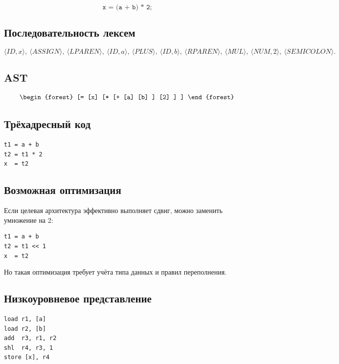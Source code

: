 \documentclass[12pt,a4paper]{article}
\begin{document}
\[
\texttt{x = (a + b) * 2;}
\]

\subsection{Последовательность лексем}

\[
\langle ID,x\rangle,\
\langle ASSIGN\rangle,\
\langle LPAREN\rangle,\
\langle ID,a\rangle,\
\langle PLUS\rangle,\
\langle ID,b\rangle,\
\langle RPAREN\rangle,\
\langle MUL\rangle,\
\langle NUM,2\rangle,\
\langle SEMICOLON\rangle.
\]

\subsection{AST}

\[
\begin{forest}
[=
    [x]
    [*
        [+
            [a]
            [b]
        ]
        [2]
    ]
]
\end{forest}
\]

\subsection{Трёхадресный код}

\begin{lstlisting}
t1 = a + b
t2 = t1 * 2
x  = t2
\end{lstlisting}

\subsection{Возможная оптимизация}

Если целевая архитектура эффективно выполняет сдвиг, можно заменить умножение на 2:

\begin{lstlisting}
t1 = a + b
t2 = t1 << 1
x  = t2
\end{lstlisting}

Но такая оптимизация требует учёта типа данных и правил переполнения.

\subsection{Низкоуровневое представление}

\begin{lstlisting}
load r1, [a]
load r2, [b]
add  r3, r1, r2
shl  r4, r3, 1
store [x], r4
\end{lstlisting}
\end{document}
